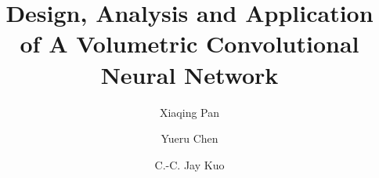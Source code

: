 \documentclass[preprint,12pt]{elsarticle}
\begin{document}
\begin{frontmatter}



\title{Design, Analysis and Application of A Volumetric Convolutional Neural Network}


\author{Xiaqing Pan}
\author{Yueru Chen}
\author{C.-C. Jay Kuo}
\address{Ming-Hsieh Department of Electrical Engineering, University of Southern California, Los Angeles, CA 90089-2564, USA}



\begin{abstract}


\end{abstract}
\end{frontmatter}
\end{document}
